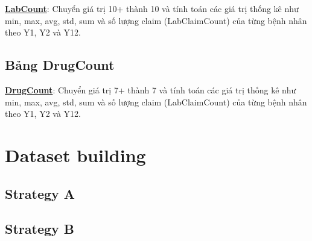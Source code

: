 \textbf{\underline{LabCount}}: Chuyển giá trị 10+ thành 10 và tính toán các giá trị thống kê như min, max, avg, std, sum và số lượng claim (LabClaimCount) của từng bệnh nhân theo Y1, Y2 và Y12.

\subsection{Bảng DrugCount}

\textbf{\underline{DrugCount}}: Chuyển giá trị 7+ thành 7 và tính toán các giá trị thống kê như min, max, avg, std, sum và số lượng claim (LabClaimCount) của từng bệnh nhân theo Y1, Y2 và Y12.

\section{Dataset building}



\subsection{Strategy A}

\subsection{Strategy B}